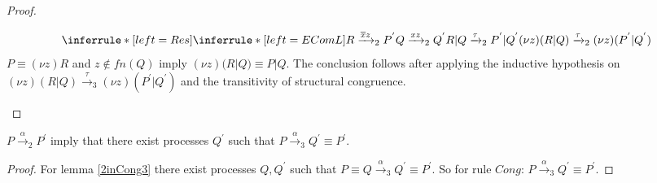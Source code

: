 \begin{lemma}
\begin{proof}
\begin{description}
\begin{itemize}
		\[
		  \inferrule* [left=Res]{
		    \inferrule* [left=EComL]{
			R \xrightarrow{\overline{x}z}_{2} P^{'}
		      \\
			Q \xrightarrow{xz}_{2} Q^{'}
		    }{
		      R|Q \xrightarrow{\tau}_{2} P^{'}|Q^{'}
		    }
		  }{
		    (\nu z)(R|Q) \xrightarrow{\tau}_{2} (\nu z)(P^{'}|Q^{'})
		  }
		\]
		$P \equiv (\nu z)R$ and $z \notin fn(Q)$ imply $(\nu z)(R|Q) \equiv P|Q$. The conclusion follows after applying the inductive hypothesis on $(\nu z)(R|Q) \xrightarrow{\tau}_{3} (\nu z)(P^{'}|Q^{'})$ and the transitivity of structural congruence.
	    \end{itemize}	    
	\end{description}
  \end{proof}
  \label{2inCong3}
\end{lemma}

\begin{theorem}
  $P\xrightarrow{\alpha}_{2} P^{'}$ imply that there exist processes $Q^{'}$ such that  $P \xrightarrow{\alpha}_{3} Q^{'} \equiv P^{'}$.
  \begin{proof}
    For lemma \ref{2inCong3} there exist processes $Q, Q^{'}$ such that $P \equiv Q \xrightarrow{\alpha}_{3} Q^{'} \equiv P^{'}$. So for rule $Cong$: $P \xrightarrow{\alpha}_{3} Q^{'} \equiv P^{'}$.
  \end{proof}
\end{theorem}




